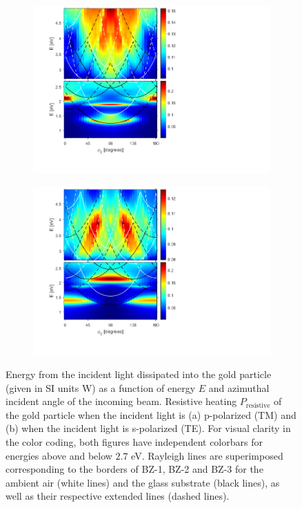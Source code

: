 \begin{figure}
    \begin{subfigure}{0.49\textwidth}
        \centering
        \includegraphics[width=\linewidth, trim=1.3cm  1.5cm 7.9cm 0cm, clip]{figures/ch4/S5B/contour/S5B_heatloss_TM_noscaling.png}
        \caption{}
        \label{}
    \end{subfigure}
    \begin{subfigure}{0.49\textwidth}
        \centering
        \includegraphics[width=\linewidth,trim=1.3cm  1.5cm 7.9cm 0cm, clip]{figures/ch4/S5B/contour/S5B_heatloss_TE_noscaling.png}
        \caption{}
        \label{}
    \end{subfigure}
    \caption{Energy from the incident light dissipated into the gold particle (given in SI units W) as a function of energy $E$ and azimuthal incident angle of the incoming beam. Resistive heating $P_\text{resistive}$ of the gold particle when the incident light is (a) p-polarized (TM) and (b) when the incident light is s-polarized (TE). For visual clarity in the color coding, both figures have independent colorbars for energies above and below $2.7$ eV. Rayleigh lines are superimposed corresponding to the borders of BZ-1, BZ-2 and BZ-3 for the ambient air (white lines) and the glass substrate (black lines), as well as their respective extended lines (dashed lines).}
    \label{fig:S5B_contour_heatloss}
\end{figure}


